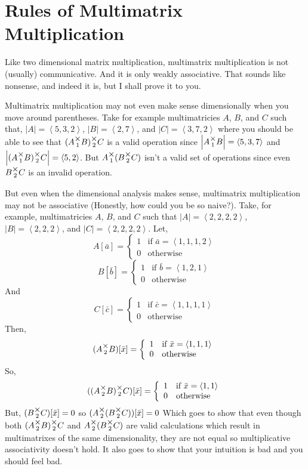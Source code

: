 \documentclass[12pt]{book}
\theoremstyle{plain}
\theoremstyle{definition}
\theoremstyle{ppart}
\theoremstyle{case}
\theoremstyle{solution}
\newcommand{\mmult}[1]{\text{\raisebox{1ex}{$\underset{#1}{\times}$}}}
\newcommand{\shape}[1]{\left|#1\right|}
\begin{document}
\section{Rules of Multimatrix Multiplication}

Like two dimensional matrix multiplication, multimatrix multiplication is
not (usually) communicative. And it is only weakly associative. That sounds like
nonsense, and indeed it is, but I shall prove it to you.

Multimatrix multiplication may not even make sense dimensionally when you move
around parentheses. Take for example multimatricies $A$, $B$, and $C$ such that,
$\shape{A} = \left<5,3,2\right>$,
$\shape{B} = \left<2,7\right>$, and
$\shape{C} = \left<3,7,2\right>$ where you should be able to see that
$(A \mmult{1} B) \mmult{2} C$ is a valid operation since
$\shape{A \mmult{1} B} = \left<5,3,7\right>$ and
$\shape{(A \mmult{1} B) \mmult{2} C} = \left<5,2\right>$. But
$A \mmult{1} (B \mmult{2} C)$ isn't a valid set of operations since even
$B \mmult{2} C$ is an invalid operation.

But even when the dimensional analysis makes sense, multimatrix multiplication
may not be associative (Honestly, how could you be so naive?). 
Take, for example, multimatricies $A$, $B$, and $C$ such
that $\shape{A} = \left<2,2,2,2\right>$, $\shape{B} = \left<2,2,2\right>$, and
$\shape{C} = \left<2,2,2,2\right>$. Let,
\[
 A[\bar{a}] = 
  \left\{
    \begin{array}{ll}
      1 & \mbox{if } \bar{a} = \left<1,1,1,2\right> \\
      0 & \mbox{otherwise}
    \end{array}
  \right.
\]
\[
 B[\bar{b}] = 
  \left\{
    \begin{array}{ll}
      1 & \mbox{if } \bar{b} = \left<1,2,1\right> \\
      0 & \mbox{otherwise}
    \end{array}
  \right.
\]
And
\[
 C[\bar{c}] = 
  \left\{
    \begin{array}{ll}
      1 & \mbox{if } \bar{c} = \left<1,1,1,1\right> \\
      0 & \mbox{otherwise}
    \end{array}
  \right.
\]
Then,
\[
 (A \mmult{2} B)[\bar{x}] = 
  \left\{
    \begin{array}{ll}
      1 & \mbox{if } \bar{x} = \left<1,1,1\right> \\
      0 & \mbox{otherwise}
    \end{array}
  \right.
\]
So,
\[
 ((A \mmult{2} B) \mmult{2} C)[\bar{x}] = 
  \left\{
    \begin{array}{ll}
      1 & \mbox{if } \bar{x} = \left<1,1\right> \\
      0 & \mbox{otherwise}
    \end{array}
  \right.
\]
But, $(B \mmult{2} C)[\bar{x}] = 0$ so $(A \mmult{2} (B \mmult{2} C))[\bar{x}] = 0$
Which goes to show that even though both $(A \mmult{2} B) \mmult{2} C$ and
$A \mmult{2} (B \mmult{2} C)$ are valid calculations which result in multimatrixes
of the same dimensionality, they are not equal so multiplicative associativity
doesn't hold. It also goes to show that your intuition is bad and you should feel bad.
\end{document}
